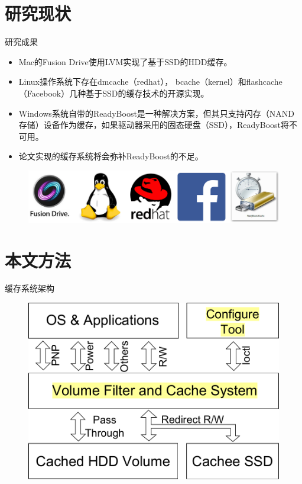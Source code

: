 \documentclass[compress]{beamer}
\begin{document}
\section{研究现状}

\begin{frame}{研究成果}
\begin{itemize}
    \item Mac的Fusion Drive使用LVM实现了基于SSD的HDD缓存。
    \item Linux操作系统下存在dmcache（redhat）， bcache（kernel）和flashcache（Facebook）几种基于SSD的缓存技术的开源实现。
    \item Windows系统自带的ReadyBoost是一种解决方案，但其只支持闪存（NAND 存储）设备作为缓存，如果驱动器采用的固态硬盘（SSD），ReadyBoost将不可用。
    \item 论文实现的缓存系统将会弥补ReadyBoost的不足。
\end{itemize}
\begin{figure}
\includegraphics[width=0.5\linewidth]{./fig/research-status}
\end{figure}
\end{frame}

\section{本文方法}
\begin{frame}{缓存系统架构}
\begin{figure}
\includegraphics[width=0.8\linewidth]{./fig/sys-overview}
\end{figure}
\end{frame}
\end{document}
